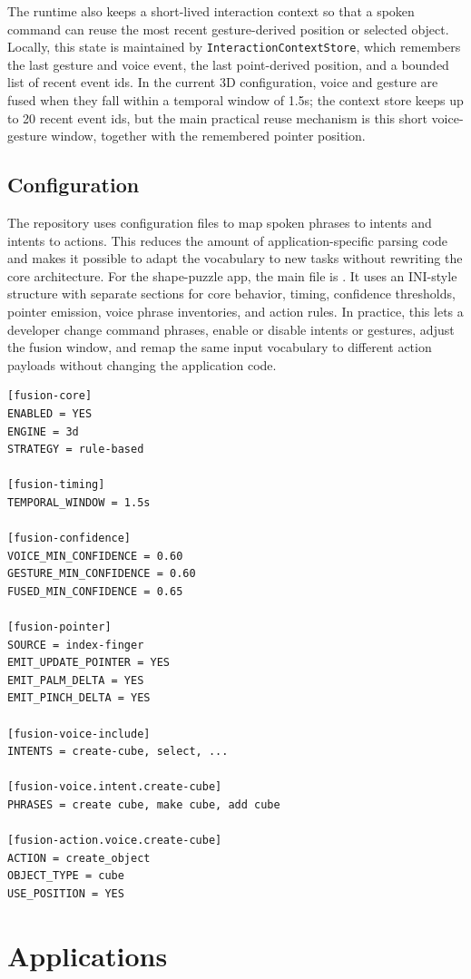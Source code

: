\documentclass[sigconf]{acmart}
\begin{document}
The runtime also keeps a short-lived interaction context so that a spoken command
can reuse the most recent gesture-derived position or selected object.
Locally, this state is maintained by \texttt{InteractionContextStore}, which
remembers the last gesture and voice event, the last point-derived position,
and a bounded list of recent event ids. In the current 3D configuration, voice
and gesture are fused when they fall within a temporal window of
1.5s; the context store keeps up to 20 recent event ids, but the
main practical reuse mechanism is this short voice-gesture window, together with
the remembered pointer position.

\subsection{Configuration}
The repository uses configuration files to map spoken phrases to intents and
intents to actions. This reduces the amount of application-specific parsing code
and makes it possible to adapt the vocabulary to new tasks without rewriting the
core architecture. For the shape-puzzle app, the main file is
. It uses an INI-style structure
with separate sections for core behavior, timing, confidence thresholds,
pointer emission, voice phrase inventories, and action rules. In practice, this
lets a developer change command phrases, enable or disable intents or gestures,
adjust the fusion window, and remap the same input vocabulary to different
action payloads without changing the application code.

\begin{verbatim}
[fusion-core]
ENABLED = YES
ENGINE = 3d
STRATEGY = rule-based

[fusion-timing]
TEMPORAL_WINDOW = 1.5s

[fusion-confidence]
VOICE_MIN_CONFIDENCE = 0.60
GESTURE_MIN_CONFIDENCE = 0.60
FUSED_MIN_CONFIDENCE = 0.65

[fusion-pointer]
SOURCE = index-finger
EMIT_UPDATE_POINTER = YES
EMIT_PALM_DELTA = YES
EMIT_PINCH_DELTA = YES

[fusion-voice-include]
INTENTS = create-cube, select, ...

[fusion-voice.intent.create-cube]
PHRASES = create cube, make cube, add cube

[fusion-action.voice.create-cube]
ACTION = create_object
OBJECT_TYPE = cube
USE_POSITION = YES
\end{verbatim}

\section{Applications}
\end{document}
